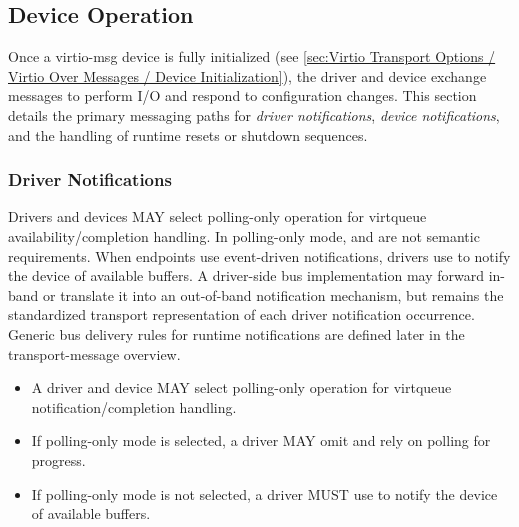 \subsection{Device Operation}
\label{sec:Virtio Transport Options / Virtio Over Messages / Device Operation}

Once a virtio-msg device is fully initialized (see
\ref{sec:Virtio Transport Options / Virtio Over Messages / Device Initialization}),
the driver and device exchange messages to perform I/O and respond to
configuration changes. This section details the primary messaging paths for
\emph{driver notifications}, \emph{device notifications}, and the handling of
runtime resets or shutdown sequences.

\subsubsection{Driver Notifications}
\label{sec:Virtio Transport Options / Virtio Over Messages / Device Operation / Driver Notifications}

Drivers and devices MAY select polling-only operation for virtqueue
availability/completion handling. In polling-only mode, 
and  are not semantic requirements. When endpoints use
event-driven notifications, drivers use  to notify the
device of available buffers. A driver-side bus implementation may forward
 in-band or translate it into an out-of-band notification
mechanism, but  remains the standardized transport
representation of each driver notification occurrence. Generic bus delivery
rules for runtime notifications are defined later in the transport-message
overview.

\begin{itemize}
  \item A driver and device MAY select polling-only operation for virtqueue
        notification/completion handling.
  \item If polling-only mode is selected, a driver MAY omit
         and rely on polling for progress.
  \item If polling-only mode is not selected, a driver MUST use
         to notify the device of available buffers.
\end{itemize}

